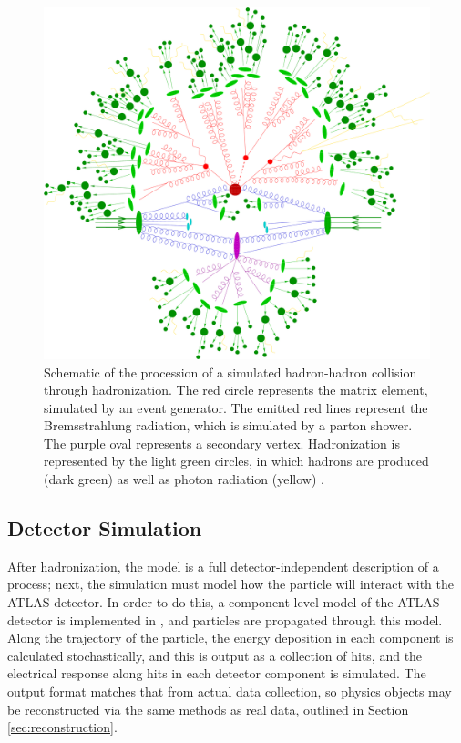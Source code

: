 \begin{figure}[!thp]
    \centering
    \includegraphics[width=1\textwidth]{chapters/chapter3_eventreco/images/parton-shower.png}

    \caption[Schematic of the procession of a simulated hadron-hadron collision.]{Schematic of the procession of a simulated hadron-hadron collision through hadronization. The red circle represents the matrix element, simulated by an event generator. The emitted red lines represent the Bremsstrahlung radiation, which is simulated by a parton shower. The purple oval represents a secondary vertex. Hadronization is represented by the light green circles, in which hadrons are produced (dark green) as well as photon radiation (yellow) \cite{parton-shower-sketch}.}
    \label{fig:parton-shower-sketch}
\end{figure}


\subsection{Detector Simulation}  \label{ssec:simulation}
After hadronization, the model is a full detector-independent description of a process; next, the simulation must model how the particle will interact with the ATLAS detector. In order to do this, a component-level model of the ATLAS detector is implemented in \GEANTFOUR \cite{geant4}, and particles are propagated through this model. Along the trajectory of the particle, the energy deposition in each component is calculated stochastically, and this is output as a collection of hits, and the electrical response along hits in each detector component is simulated. The output format matches that from actual data collection, so physics objects may be reconstructed via the same methods as real data, outlined in Section \ref{sec:reconstruction}.


